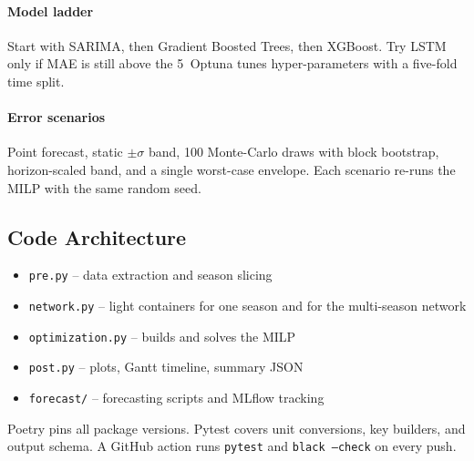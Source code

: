 \paragraph{Model ladder}

Start with SARIMA, then Gradient Boosted Trees, then XGBoost.
Try LSTM only if MAE is still above the 5 %
Optuna tunes hyper-parameters with a five-fold
time split.

\paragraph{Error scenarios}

Point forecast, static \(\pm\sigma\) band, 100
Monte-Carlo draws with block bootstrap, horizon-scaled band,
and a single worst-case envelope.
Each scenario re-runs the MILP with the same random seed.

\subsection{Code Architecture}

\begin{itemize}
\item \texttt{pre.py} – data extraction and season slicing  
\item \texttt{network.py} – light containers for one season and for the
      multi-season network  
\item \texttt{optimization.py} – builds and solves the MILP  
\item \texttt{post.py} – plots, Gantt timeline, summary JSON  
\item \texttt{forecast/} – forecasting scripts and MLflow tracking  
\end{itemize}

Poetry pins all package versions.
Pytest covers unit conversions, key builders, and output schema.
A GitHub action runs \texttt{pytest} and \texttt{black --check} on every push.